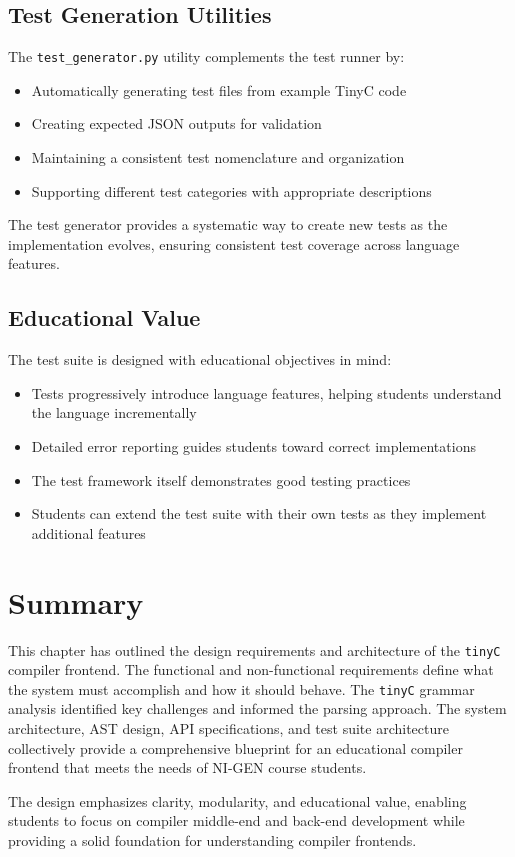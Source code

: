 \subsection{Test Generation Utilities}
The \texttt{test_generator.py} utility complements the test runner by:
\begin{itemize}
\item Automatically generating test files from example TinyC code
\item Creating expected JSON outputs for validation
\item Maintaining a consistent test nomenclature and organization
\item Supporting different test categories with appropriate descriptions
\end{itemize}
The test generator provides a systematic way to create new tests as the implementation evolves, ensuring consistent test coverage across language features.
\subsection{Educational Value}
The test suite is designed with educational objectives in mind:
\begin{itemize}
\item Tests progressively introduce language features, helping students understand the language incrementally
\item Detailed error reporting guides students toward correct implementations
\item The test framework itself demonstrates good testing practices
\item Students can extend the test suite with their own tests as they implement additional features
\end{itemize}




\section{Summary}

This chapter has outlined the design requirements and architecture of the \texttt{tinyC} compiler frontend. The functional and non-functional requirements define what the system must accomplish and how it should behave. The \texttt{tinyC} grammar analysis identified key challenges and informed the parsing approach. The system architecture, AST design, API specifications, and test suite architecture collectively provide a comprehensive blueprint for an educational compiler frontend that meets the needs of NI-GEN course students.

The design emphasizes clarity, modularity, and educational value, enabling students to focus on compiler middle-end and back-end development while providing a solid foundation for understanding compiler frontends.